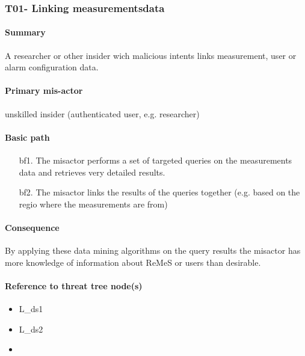 \subsubsection{T01- Linking measurementsdata}
\label{threats:t01}

\paragraph{Summary}

\npar A researcher or other insider wich malicious intents links measurement,
user or alarm configuration data.

\paragraph{Primary mis-actor}

\npar unskilled insider (authenticated user, e.g. researcher)

\paragraph{Basic path}
\begin{enumerate}
	\item[bf1.] The misactor performs a set of targeted queries on the
	measurements data and retrieves very detailed results.
    \item[bf2.] The misactor links the results of the queries together (e.g.
    based on the regio where the measurements are from)
\end{enumerate}

\paragraph{Consequence}

\npar By applying these data mining algorithms on the query results the misactor
has more knowledge of information about ReMeS or users than desirable. 

\paragraph{Reference to threat tree node(s)} 

\begin{itemize}
  \item L\_ds1
  \item L\_ds2
  \item 
\end{itemize}

